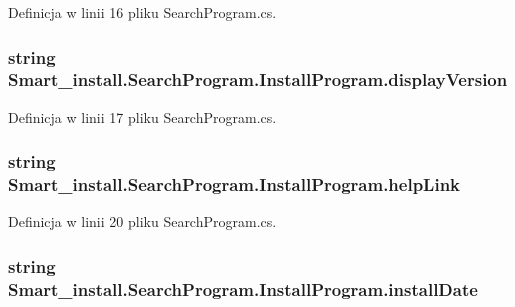 Definicja w linii 16 pliku Search\+Program.\+cs.

\hypertarget{struct_smart__install_1_1_search_program_1_1_install_program_ae0e1bf0c9bae9086be9174f97da9884f}{
\subsubsection[{display\+Version}]{\setlength{\rightskip}{0pt plus 5cm}string Smart\+\_\+install.\+Search\+Program.\+Install\+Program.\+display\+Version}}\label{struct_smart__install_1_1_search_program_1_1_install_program_ae0e1bf0c9bae9086be9174f97da9884f}


Definicja w linii 17 pliku Search\+Program.\+cs.

\hypertarget{struct_smart__install_1_1_search_program_1_1_install_program_a343596c9b762754aa6875d7241a2f331}{
\subsubsection[{help\+Link}]{\setlength{\rightskip}{0pt plus 5cm}string Smart\+\_\+install.\+Search\+Program.\+Install\+Program.\+help\+Link}}\label{struct_smart__install_1_1_search_program_1_1_install_program_a343596c9b762754aa6875d7241a2f331}


Definicja w linii 20 pliku Search\+Program.\+cs.

\hypertarget{struct_smart__install_1_1_search_program_1_1_install_program_a3088b7eee1a31636eb1f874087f13644}{
\subsubsection[{install\+Date}]{\setlength{\rightskip}{0pt plus 5cm}string Smart\+\_\+install.\+Search\+Program.\+Install\+Program.\+install\+Date}}\label{struct_smart__install_1_1_search_program_1_1_install_program_a3088b7eee1a31636eb1f874087f13644}


